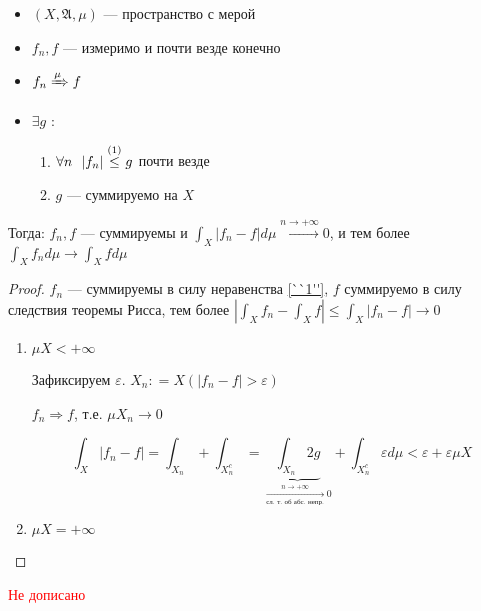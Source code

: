 \begin{theorem}[Лебега]\itemfix
    \begin{itemize}
        \item \((X, \mathfrak{A}, \mu)\) --- пространство с мерой
        \item \(f_n, f\) --- измеримо и почти везде конечно
        \item \(f_n \xRightarrow{\mu} f\)
        \item \(\exists g\) : \begin{enumerate}
                  \item \(\forall n \ \ |f_n| \symref{``1''}{\leq} g\) почти везде
                  \item  \(g\) --- суммируемо на \(X\)
              \end{enumerate}
    \end{itemize}

    Тогда: \(f_n, f\) --- суммируемы и \(\int_X |f_n - f| d\mu \xrightarrow{n \to +\infty} 0\), и тем более \(\int_X f_n d\mu \to \int_X f d\mu\)
\end{theorem}
\begin{proof}
    \(f_n\) --- суммируемы в силу неравенства \eqref{``1''}, \(f\) суммируемо в силу следствия теоремы Рисса, тем более \(|\int_X f_n - \int_X f| \leq  \int_X |f_n - f| \to 0\)

    \begin{enumerate}
        \item \(\mu X < +\infty\)

              Зафиксируем \(\varepsilon\). \(X_n : = X(|f_n - f| > \varepsilon)\)

              \(f_n \Rightarrow f\), т.е. \(\mu X_n \to 0\)

              \[\int_X |f_n - f| = \int_{X_n} + \int_{X_n^c} = \underbrace{\int_{X_n} 2g}_{\xrightarrow[\text{сл. т. об абс. непр.}]{n \to +\infty} 0} + \int_{X_n^c} \varepsilon d\mu < \varepsilon + \varepsilon \mu X\]

        \item \(\mu X = +\infty\)
    \end{enumerate}
\end{proof}

\textcolor{red}{Не дописано}

